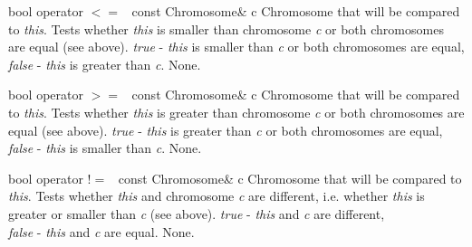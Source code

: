 \clearpage

    \setConstInstance
    \printMethodWithOneParam
        {bool}  
        {operator $<=$\ } 
        {const Chromosome\&}
        {c} 
        {Chromosome that will be compared to {\em this}.}
        {Tests whether {\em this} is smaller than chromosome {\em c}
         or both chromosomes are equal (see above).}
        {
         {\em true}\hspace{2pt} - {\em this} is smaller than {\em c} or both
         chromosomes are equal,\\
         {\em false} - {\em this} is greater than {\em c}.}
        {None.}

\vspace*{4ex}

    \setConstInstance
    \printMethodWithOneParam
        {bool}  
        {operator $>=$\ } 
        {const Chromosome\&}
        {c}
        {Chromosome that will be compared to {\em this}.}
        {Tests whether {\em this} is greater than chromosome {\em c}
         or both chromosomes are equal (see above).}
        {
         {\em true}\hspace{2pt} - {\em this} is greater than {\em c} or both
         chromosomes are equal,\\ 
         {\em false} - {\em this} is smaller than {\em c}.}
        {None.}

\vspace*{4ex}

    \setConstInstance
    \printMethodWithOneParam
        {bool}  
        {operator !$=$\ } 
        {const Chromosome\&}
        {c} 
        {Chromosome that will be compared to {\em this}.}
        {Tests whether {\em this} and chromosome {\em c} are
         different, i.e. whether {\em this} is greater or
         smaller than {\em c} (see above).}
        {
         {\em true}\hspace{2pt} - {\em this} and {\em c} are different,\\
         {\em false} - {\em this} and {\em c} are equal.}
        {None.}

